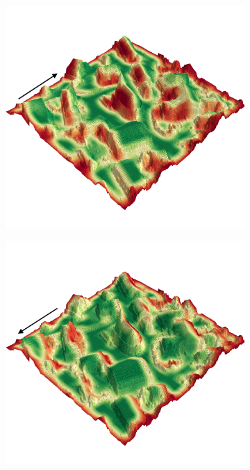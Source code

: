 \documentclass[../document.tex]{subfiles}
\begin{document}
\begin{figure}[H]
  \centering
  \begin{subfigure}[b]{0.45\textwidth}
    \includegraphics[width=\linewidth]{../img/4/traversability/sullens/-270.png} 
  \end{subfigure}
  \begin{subfigure}[b]{0.45\textwidth}
      \includegraphics[width=\linewidth]{../img/4/traversability/sullens/-90.png}

\end{subfigure}
\end{figure}
\end{document}
